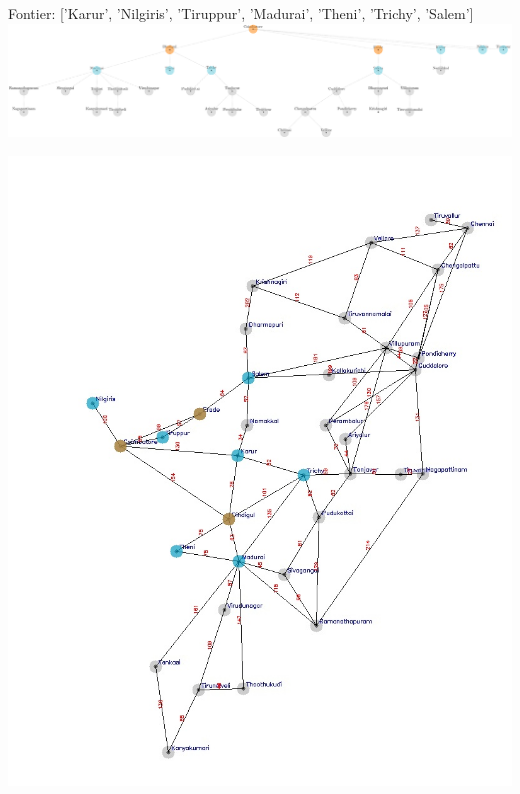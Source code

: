 \documentclass[xcolor=table]{beamer}
\begin{document}
\begin{frame}
  { \tiny Fontier: ['Karur', 'Nilgiris', 'Tiruppur', 'Madurai', 'Theni', 'Trichy', 'Salem'] }
  \includegraphics[width=1\textwidth]{../BFSNodes/5-1.png}
  \begin{center}
    \includegraphics[height=0.6\textheight]{../BFSoutput/tamilBFS3.jpg}
  \end{center}
\end{frame}
\end{document}
